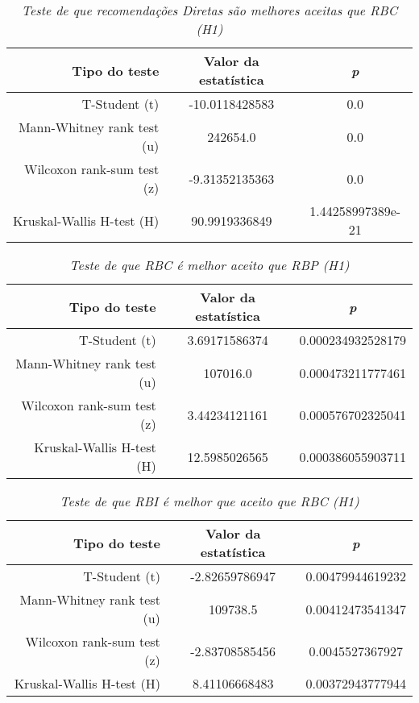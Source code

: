 \begin{table}
\centering
\begin{tabular}{|r|c|c|}
    \hline
    \textbf{Tipo do teste} & \textbf{Valor da estatística} & \textbf{\textit{p}} \\
    \hline
T-Student (t) & -10.0118428583 & 0.0 \\
\hline 
Mann-Whitney rank test (u) & 242654.0 & 0.0 \\
\hline 
Wilcoxon rank-sum test (z) & -9.31352135363 & 0.0 \\
\hline 
Kruskal-Wallis H-test (H) & 90.9919336849 & 1.44258997389e-21 \\
\hline 

    \end{tabular}
\caption{\it Teste de que recomendações Diretas são melhores aceitas que RBC (H1)}
\end{table}


\begin{table}
\centering
\begin{tabular}{|r|c|c|}
    \hline
    \textbf{Tipo do teste} & \textbf{Valor da estatística} & \textbf{\textit{p}} \\
    \hline
T-Student (t) & 3.69171586374 & 0.000234932528179 \\
\hline 
Mann-Whitney rank test (u) & 107016.0 & 0.000473211777461 \\
\hline 
Wilcoxon rank-sum test (z) & 3.44234121161 & 0.000576702325041 \\
\hline 
Kruskal-Wallis H-test (H) & 12.5985026565 & 0.000386055903711 \\
\hline 

    \end{tabular}
\caption{\it Teste de que RBC é melhor aceito que RBP (H1)}
\end{table}


\begin{table}
\centering
\begin{tabular}{|r|c|c|}
    \hline
    \textbf{Tipo do teste} & \textbf{Valor da estatística} & \textbf{\textit{p}} \\
    \hline
T-Student (t) & -2.82659786947 & 0.00479944619232 \\
\hline 
Mann-Whitney rank test (u) & 109738.5 & 0.00412473541347 \\
\hline 
Wilcoxon rank-sum test (z) & -2.83708585456 & 0.0045527367927 \\
\hline 
Kruskal-Wallis H-test (H) & 8.41106668483 & 0.00372943777944 \\
\hline 

    \end{tabular}
\caption{\it Teste de que RBI é melhor que aceito que RBC (H1)}
\end{table}

